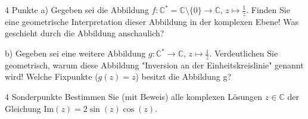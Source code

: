 \documentclass{../problemset}
\begin{document}
\begin{problem}[Einheitskreis]{4 Punkte}
a) Gegeben sei die Abbildung $f : \mathbb{C}^* = \mathbb{C} \setminus \{0\} \rightarrow \mathbb{C}$, $z \mapsto \frac{1}{z}$. Finden Sie eine geometrische Interpretation dieser Abbildung in der komplexen Ebene! Was geschieht durch die Abbildung anschaulich?

b) Gegeben sei eine weitere Abbildung $g : \mathbb{C}^* \rightarrow
	\mathbb{C}$, $z \mapsto \frac{1}{\overline{z}}$. Verdeutlichen Sie geometrisch,
warum diese Abbildung "Inversion an der Einheitskreislinie" genannt wird!
Welche Fixpunkte ($g(z) = z$) besitzt die Abbildung g?

\end{problem}

\begin{problem}{4 Sonderpunkte}
Bestimmen Sie (mit Beweis) alle komplexen Lösungen $z \in \mathbb{C}$ der Gleichung $\text{Im}(z) = 2\sin(z)\cos(z)$.
\end{problem}
\end{document}
